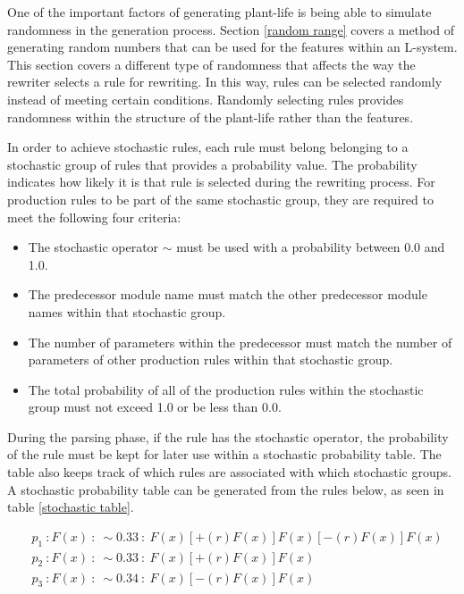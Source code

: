 One of the important factors of generating plant-life is being able to simulate randomness in the generation process. Section \ref{random range} covers a method of generating random numbers that can be used for the features within an L-system. This section covers a different type of randomness that affects the way the rewriter selects a rule for rewriting. In this way, rules can be selected randomly instead of meeting certain conditions. Randomly selecting rules provides randomness within the structure of the plant-life rather than the features.

In order to achieve stochastic rules, each rule must belong belonging to a stochastic group of rules that provides a probability value. The probability indicates how likely it is that rule is selected during the rewriting process. For production rules to be part of the same stochastic group, they are required to meet the following four criteria: 

\begin{itemize}
\item The stochastic operator $\sim$ must be used with a probability between 0.0 and 1.0.
\item The predecessor module name must match the other predecessor module names within that stochastic group.
\item The number of parameters within the predecessor must match the number of parameters of other production rules within that stochastic group.
\item The total probability of all of the production rules within the stochastic group must not exceed 1.0 or be less than 0.0.
\end{itemize}

\noindent
During the parsing phase, if the rule has the stochastic operator, the probability of the rule must be kept for later use within a stochastic probability table. The table also keeps track of which rules are associated with which stochastic groups. A stochastic probability table can be generated from the rules below, as seen in table \ref{stochastic table}. 

\begin{equation} \label{stochastic implementation example}
\begin{aligned}
	&p_1~ :  F(x)~ :~ \sim 0.33 ~ :~ F(x)[+(r)F(x)]F(x)[-(r)F(x)]F(x)\\
	&p_2~ :  F(x)~ :~ \sim 0.33 ~ :~ F(x)[+(r)F(x)]F(x)\\
	&p_3~ :  F(x)~ :~ \sim 0.34 ~ :~ F(x)[-(r)F(x)]F(x)\\
\end{aligned}
\end{equation}

